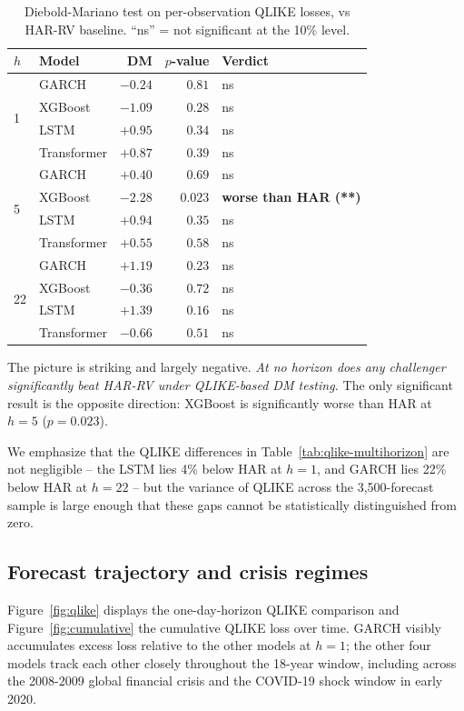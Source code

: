\documentclass[11pt]{article}
\begin{document}
\begin{table}[H]
\centering
\caption{Diebold-Mariano test on per-observation QLIKE losses, vs
HAR-RV baseline. ``ns'' = not significant at the 10\% level.}
\label{tab:dm-multihorizon}
\begin{tabular}{llrrl}
\toprule
$h$ & Model & DM & $p$-value & Verdict \\
\midrule
\multirow{4}{*}{1}
& GARCH       & $-0.24$ & $0.81$ & ns \\
& XGBoost     & $-1.09$ & $0.28$ & ns \\
& LSTM        & $+0.95$ & $0.34$ & ns \\
& Transformer & $+0.87$ & $0.39$ & ns \\
\midrule
\multirow{4}{*}{5}
& GARCH       & $+0.40$ & $0.69$ & ns \\
& XGBoost     & $-2.28$ & $\bm{0.023}$ & \textbf{worse than HAR (**)} \\
& LSTM        & $+0.94$ & $0.35$ & ns \\
& Transformer & $+0.55$ & $0.58$ & ns \\
\midrule
\multirow{4}{*}{22}
& GARCH       & $+1.19$ & $0.23$ & ns \\
& XGBoost     & $-0.36$ & $0.72$ & ns \\
& LSTM        & $+1.39$ & $0.16$ & ns \\
& Transformer & $-0.66$ & $0.51$ & ns \\
\bottomrule
\end{tabular}
\end{table}

The picture is striking and largely negative. \emph{At no horizon
does any challenger significantly beat HAR-RV under QLIKE-based DM
testing.} The only significant result is the opposite direction:
XGBoost is significantly worse than HAR at $h=5$ ($p=0.023$).

We emphasize that the QLIKE differences in Table~\ref{tab:qlike-multihorizon}
are not negligible -- the LSTM lies 4\% below HAR at $h=1$, and
GARCH lies 22\% below HAR at $h=22$ -- but the variance of QLIKE
across the 3{,}500-forecast sample is large enough that these gaps
cannot be statistically distinguished from zero.

\subsection{Forecast trajectory and crisis regimes}

Figure~\ref{fig:qlike} displays the one-day-horizon QLIKE
comparison and Figure~\ref{fig:cumulative} the cumulative QLIKE
loss over time. GARCH visibly accumulates excess loss relative to
the other models at $h=1$; the other four models track each other
closely throughout the 18-year window, including across the
2008-2009 global financial crisis and the COVID-19 shock window in
early 2020.
\end{document}
